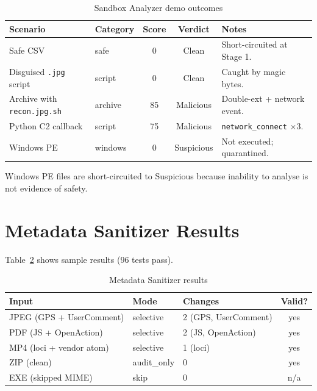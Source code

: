 \documentclass[12pt, a4paper]{report}
\begin{document}
\begin{table}[H]
\centering
\caption{Sandbox Analyzer demo outcomes}
\label{tab:sb_demo}
\begin{tabular}{|p{4cm}|l|c|c|p{4.5cm}|}
\hline
\textbf{Scenario} & \textbf{Category} & \textbf{Score} & \textbf{Verdict} & \textbf{Notes} \\
\hline
Safe CSV & safe & 0 & Clean & Short-circuited at Stage 1. \\
\hline
Disguised \texttt{.jpg} script & script & 0 & Clean & Caught by magic bytes. \\
\hline
Archive with \texttt{recon.jpg.sh} & archive & 85 & Malicious & Double-ext + network event. \\
\hline
Python C2 callback & script & 75 & Malicious & \texttt{network\_connect} $\times 3$. \\
\hline
Windows PE & windows & 0 & Suspicious & Not executed; quarantined. \\
\hline
\end{tabular}
\end{table}

Windows PE files are short-circuited to Suspicious because inability
to analyse is not evidence of safety.

\section{Metadata Sanitizer Results}

Table~\ref{tab:ms_results} shows sample results (96 tests pass).

\begin{table}[H]
\centering
\caption{Metadata Sanitizer results}
\label{tab:ms_results}
\begin{tabular}{|p{4cm}|l|p{3.5cm}|c|}
\hline
\textbf{Input} & \textbf{Mode} & \textbf{Changes} & \textbf{Valid?} \\
\hline
JPEG (GPS + UserComment) & selective & 2 (GPS, UserComment) & yes \\
\hline
PDF (JS + OpenAction) & selective & 2 (JS, OpenAction) & yes \\
\hline
MP4 (loci + vendor atom) & selective & 1 (loci) & yes \\
\hline
ZIP (clean) & audit\_only & 0 & yes \\
\hline
EXE (skipped MIME) & skip & 0 & n/a \\
\hline
\end{tabular}
\end{table}
\end{document}
